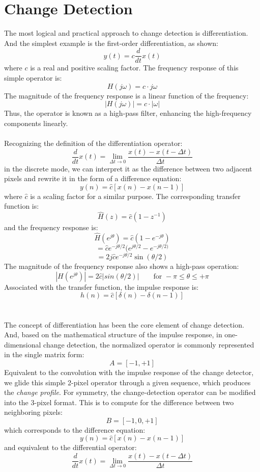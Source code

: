 \documentclass{article}
\begin{document}
\section{Change Detection}
The most logical and practical approach to change detection is differentiation. And the simplest example is the first-order differentiation, as shown:
\[
y(t)=c\frac{d}{dt}x(t)
\]
where \(c\) is a real and positive scaling factor. The frequency response of this simple operator is:
\[
H(j\omega)=c\cdot j\omega
\]
The magnitude of the frequency response is a linear function of the frequency:
\[
|H(j\omega)|=c\cdot|\omega|
\]
Thus, the operator is known as a high-pass filter, enhancing the high-frequency components linearly.
\\
\\
Recognizing the definition of the differentiation operator:
\[
\frac{d}{dt}x(t)=\lim_{\Delta t\rightarrow0}\frac{x(t)-x(t-\Delta t)}{\Delta t}
\]
in the discrete mode, we can interpret it as the difference between two adjacent pixels and rewrite it in the form of a difference equation:
\[
y(n)=\hat{c}[x(n)-x(n-1)]
\]
where \(\hat{c}\) is a scaling factor for a similar purpose. The corresponding transfer function is:
\[
\hat{H}(z)=\hat{c}(1-z^{-1})
\]
and the frequency response is:
\[
\hat{H}(e^{j\theta})=\hat{c}(1-e^{-j\theta})
\]
\[
=\hat{c}e^{-j\theta/2}(e^{j\theta/2}-e^{-j\theta/2)}
\]
\[
=2j\hat{c}e^{-j\theta/2}\sin(\theta/2)
\]
The magnitude of the frequency response also shows a high-pass operation:
\[
|H(e^{j\theta})|=2\hat{c}|sin(\theta/2)| \qquad \text{for }-\pi\leq\theta\leq+\pi 
\]
Associated with the transfer function, the impulse response is:
\[
h(n)=\hat{c}[\delta(n)-\delta(n-1)]
\]
\\
\\
The concept of differentiation has been the core element of change detection. And, based on the mathematical structure of the impulse response, in one-dimensional change detection, the normalized operator is commonly represented in the single matrix form:
\[
A=[-1,+1]
\]
Equivalent to the convolution with the impulse response of the change detector, we glide this simple 2-pixel operator through a given sequence, which produces the \textit{change profile}. For symmetry, the change-detection operator can be modified into the 3-pixel format. This is to compute for the difference between two neighboring pixels:
\[
B=[-1,0,+1]
\]
which corresponds to the difference equation:
\[
y(n)=\hat{c}[x(n)-x(n-1)]
\]
and equivalent to the differential operator:
\[
\frac{d}{dt}x(t)=\lim_{\Delta t\rightarrow0}\frac{x(t)-x(t-\Delta t)}{\Delta t}
\]
\end{document}
